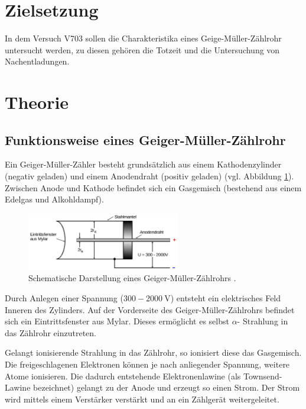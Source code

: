 \setcounter{page}{1}
\section*{Zielsetzung}

In dem Versuch V703 sollen die Charakteristika eines
Geige-Müller-Zählrohr untersucht werden, zu diesen gehören die
Totzeit und die Untersuchung von Nachentladungen.

\section{Theorie}

\subsection{Funktionsweise eines Geiger-Müller-Zählrohr}
Ein Geiger-Müller-Zähler besteht grundsätzlich aus einem
Kathodenzylinder (negativ geladen) und einem Anodendraht (positiv geladen) (vgl. Abbildung \ref{fig: schematischer_aufbau}).
Zwischen Anode und Kathode befindet sich ein Gasgemisch (bestehend aus einem Edelgas
und Alkohldampf).
\begin{figure}
  \centering
  \includegraphics[width=0.6\textwidth]{bilder/geiger_.png}
  \caption{Schematische Darstellung eines Geiger-Müller-Zählrohrs \cite{anleitung703}.}
  \label{fig: schematischer_aufbau}
  \end{figure}
Durch Anlegen einer Spannung ($300-\SI{2000}{\volt}$) entsteht ein elektrisches
Feld Inneren des Zylinders. Auf der Vorderseite des Geiger-Müller-Zählrohrs
befindet sich ein Eintrittsfenster aus Mylar. Dieses ermöglicht es selbst $\alpha$-
Strahlung in das Zählrohr einzutreten.

Gelangt ionisierende Strahlung in das Zählrohr, so ionisiert diese das Gasgemisch.
Die freigeschlagenen Elektronen können je nach anliegender Spannung, weitere Atome ionisieren.
Die dadurch entstehende Elektronenlawine (als Townsend-Lawine bezeichnet) gelangt zu der Anode und erzeugt so
einen Strom. Der Strom wird mittels einem Verstärker verstärkt und an ein
Zählgerät weitergeleitet.


